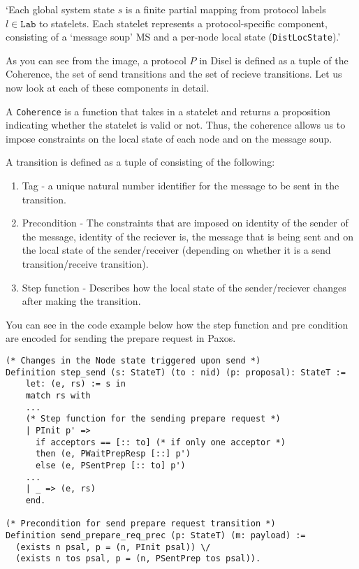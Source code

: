 `Each global system state $s$ is a finite partial mapping from protocol labels
$l \in \mathrm{\texttt{Lab}}$ to statelets. Each statelet represents a
protocol-specific component, consisting of a `message soup' MS and a per-node
local state (\texttt{DistLocState}).'


As you can see from the image, a protocol $P$ in Disel is defined as a tuple
of the Coherence, the set of send transitions and the set of recieve transitions.
Let us now look at each of these components in detail.

A \texttt{Coherence} is a function that takes in a statelet and returns a proposition
indicating whether the statelet is valid or not. Thus, the coherence allows us
to impose constraints on the local state of each node and on the message soup.

A transition is defined as a tuple of consisting of the following:
\begin{enumerate}
  \item Tag - a unique natural number identifier for the message to be sent in the transition.
  \item Precondition - The constraints that are imposed on identity of the sender of the message,
    identity of the reciever is, the message that is being sent and on the local state of
    the sender/receiver (depending on whether it is a send transition/receive transition).
  \item Step function - Describes how the local state of the sender/reciever changes after
    making the transition.
\end{enumerate}

You can see in the code example below how the step function and pre condition
are encoded for sending the prepare request in Paxos.

\begin{lstlisting}
(* Changes in the Node state triggered upon send *)
Definition step_send (s: StateT) (to : nid) (p: proposal): StateT :=
    let: (e, rs) := s in
    match rs with
    ...
    (* Step function for the sending prepare request *)
    | PInit p' =>
      if acceptors == [:: to] (* if only one acceptor *)
      then (e, PWaitPrepResp [::] p')
      else (e, PSentPrep [:: to] p')
    ...
    | _ => (e, rs)
    end.

(* Precondition for send prepare request transition *)
Definition send_prepare_req_prec (p: StateT) (m: payload) :=
  (exists n psal, p = (n, PInit psal)) \/
  (exists n tos psal, p = (n, PSentPrep tos psal)).
\end{lstlisting}


